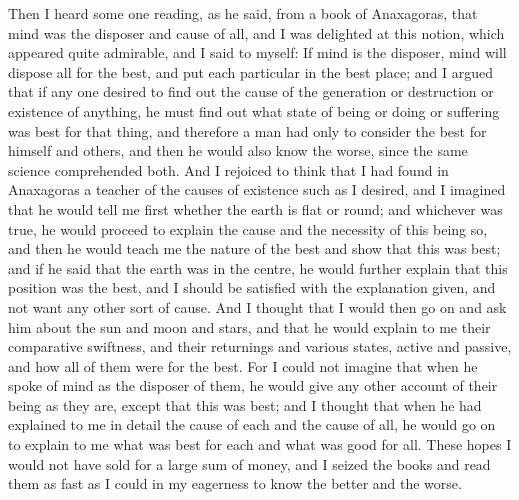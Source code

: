 Then I heard some one reading, as he said, from a book of Anaxagoras,
that mind was the disposer and cause of all, and I was delighted at this
notion, which appeared quite admirable, and I said to myself: If mind
is the disposer, mind will dispose all for the best, and put each
particular in the best place; and I argued that if any one desired to
find out the cause of the generation or destruction or existence of
anything, he must find out what state of being or doing or suffering was
best for that thing, and therefore a man had only to consider the best
for himself and others, and then he would also know the worse, since the
same science comprehended both. And I rejoiced to think that I had found
in Anaxagoras a teacher of the causes of existence such as I desired,
and I imagined that he would tell me first whether the earth is flat or
round; and whichever was true, he would proceed to explain the cause and
the necessity of this being so, and then he would teach me the nature of
the best and show that this was best; and if he said that the earth was
in the centre, he would further explain that this position was the best,
and I should be satisfied with the explanation given, and not want any
other sort of cause. And I thought that I would then go on and ask him
about the sun and moon and stars, and that he would explain to me their
comparative swiftness, and their returnings and various states, active
and passive, and how all of them were for the best. For I could not
imagine that when he spoke of mind as the disposer of them, he would
give any other account of their being as they are, except that this was
best; and I thought that when he had explained to me in detail the cause
of each and the cause of all, he would go on to explain to me what was
best for each and what was good for all. These hopes I would not have
sold for a large sum of money, and I seized the books and read them as
fast as I could in my eagerness to know the better and the worse.

